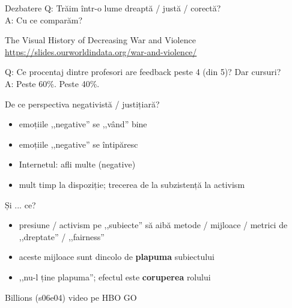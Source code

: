 \documentclass{simple}
\begin{document}
\begin{frame}{Dezbatere}
  \pause
  \centering
  \LARGE{Q: Trăim într-o lume dreaptă / justă / corectă?}\\
  \vspace{1cm}
  \pause
  \LARGE{A: Cu ce comparăm?}
\end{frame}

\begin{frame}{The Visual History of Decreasing War and Violence}
  \centering
  \url{https://slides.ourworldindata.org/war-and-violence/}
\end{frame}

\begin{frame}{}
  \pause
  \centering
  \LARGE{Q: Ce procentaj dintre profesori are feedback peste 4 (din 5)? Dar cursuri?}\\
  \vspace{1cm}
  \pause
  \LARGE{A: Peste 60\%. Peste 40\%.}
\end{frame}

\begin{frame}{De ce perspectiva negativistă / justițiară?}
  \begin{itemize}
    \pause \item emoțiile ,,negative'' se ,,vând'' bine
    \pause \item emoțiile ,,negative'' se întipăresc
    \pause \item Internetul: afli multe (negative)
    \pause \item mult timp la dispoziție; trecerea de la subzistență la activism
  \end{itemize}
\end{frame}

\begin{frame}{Și ... ce?}
  \begin{itemize}
    \pause \item presiune / activism pe ,,subiecte'' să aibă metode / mijloace / metrici de ,,dreptate'' / ,,fairness''
    \pause \item aceste mijloace sunt dincolo de \textbf{plapuma} subiectului
    \pause \item ,,nu-l ține plapuma''; efectul este \textbf{coruperea} rolului
  \end{itemize}
\end{frame}

\begin{frame}{Billions (s06e04)}
  \centering
  \LARGE{video pe HBO GO}
\end{frame}
\end{document}
